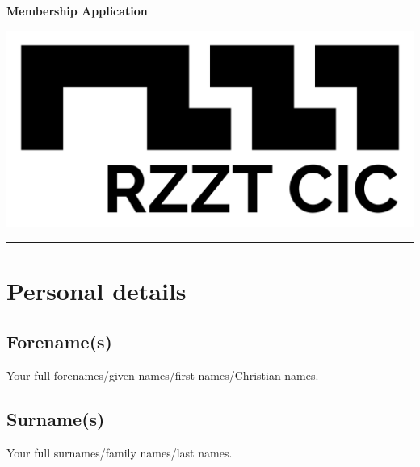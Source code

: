 \documentclass[a4paper,10pt]{article}
\begin{document}
\thispagestyle{firstpage}

\begin{Form}

\begin{minipage}[b]{0.75\textwidth}
  \LARGE\textbf{{Membership Application}}
  \vspace{0.05em}
\end{minipage}
%
\begin{minipage}[b]{0.25\textwidth}
  \raggedleft
  \includegraphics[width=1\textwidth]{logo-black.jpg}
\end{minipage}

\hrule

\section{Personal details}

\subsection{Forename(s)}

Your full forenames/given names/first names/Christian names.

\begin{framed}%
  \TextField[width=\textwidth,maxlen=75,donotscroll=true,name=forename]{ }%
\end{framed}%

\subsection{Surname(s)}

Your full surnames/family names/last names.

\begin{framed}%
  \TextField[width=\textwidth,donotscroll=true,name=surname]{ }%
\end{framed}%


\end{Form}
\end{document}
